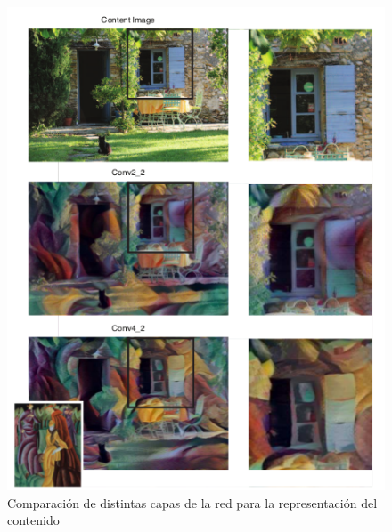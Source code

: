 \documentclass[a4paper,11pt,spanish]{book}
\begin{document}
\begin{itemize}
\begin{figure}[h]
	    \includegraphics[width=\textwidth]{./img/content_repr_layers.png}
	    \caption{Comparación de distintas capas de la red para la representación del contenido}
	    \label{fig:content_repr_layers}
	 \end{figure}
	 

\end{itemize}
\end{document}
